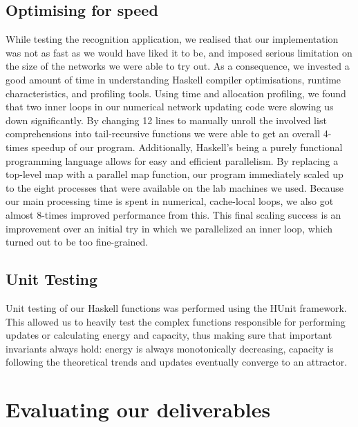 \subsection{Optimising for speed}

While testing the recognition application, we realised that our implementation was not as fast as we would have liked it to be, and imposed serious limitation on the size of the networks we were able to try out.
As a consequence, we invested a good amount of time in understanding Haskell compiler optimisations, runtime characteristics, and profiling tools. Using time and allocation profiling, we found that two inner loops in our numerical network updating code were slowing us down significantly. By changing 12 lines to manually unroll the involved list comprehensions into tail-recursive functions we were able to get an overall 4-times speedup of our program.
Additionally, Haskell's being a purely functional programming language allows for easy and efficient parallelism.
By replacing a top-level map with a parallel map function, our program immediately scaled up to the eight processes that were available on the lab machines we used. Because our main processing time is spent in numerical, cache-local loops, we also got almost 8-times improved performance from this. This final scaling success is an improvement over an initial try in which we parallelized an inner loop, which turned out to be too fine-grained.


\subsection{Unit Testing}

Unit testing of our Haskell functions was performed using the HUnit framework. This allowed us to heavily test the complex functions responsible for performing updates or calculating energy and capacity, thus making sure that important invariants always hold: energy is always monotonically decreasing, capacity is following the theoretical trends and updates eventually converge to an attractor.


\section{Evaluating our deliverables}

